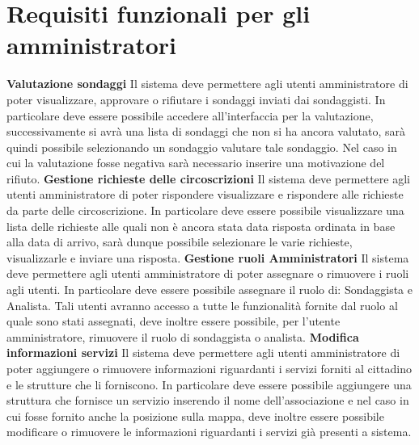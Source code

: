     \section{Requisiti funzionali per gli amministratori}
        \begin{rfList}
            \rfItem \textbf{Valutazione sondaggi} Il sistema deve permettere agli utenti amministratore di poter visualizzare, approvare o rifiutare i sondaggi inviati dai sondaggisti. In particolare deve essere possibile accedere all'interfaccia per la valutazione, successivamente si avrà una lista di sondaggi che non si ha ancora valutato, sarà quindi possibile selezionando un sondaggio valutare tale sondaggio. Nel caso in cui la valutazione fosse negativa sarà necessario inserire una motivazione del rifiuto.
            \rfItem \textbf{Gestione richieste delle circoscrizioni} Il sistema deve permettere agli utenti amministratore di poter rispondere visualizzare e rispondere alle richieste da parte delle circoscrizione. In particolare deve essere possibile visualizzare una lista delle richieste alle quali non è ancora stata data risposta ordinata in base alla data di arrivo, sarà dunque possibile selezionare le varie richieste, visualizzarle e inviare una risposta.
            \rfItem \textbf{Gestione ruoli Amministratori} Il sistema deve permettere agli utenti amministratore di poter assegnare o rimuovere i ruoli agli utenti. In particolare deve essere possibile assegnare il ruolo di: Sondaggista e Analista. Tali utenti avranno accesso a tutte le funzionalità fornite dal ruolo al quale sono stati assegnati, deve inoltre essere possibile, per l'utente amministratore, rimuovere il ruolo di sondaggista o analista.
            \rfItem \textbf{Modifica informazioni servizi} Il sistema deve permettere agli utenti amministratore di poter aggiungere o rimuovere informazioni riguardanti i servizi forniti al cittadino e le strutture che li forniscono. In particolare deve essere possibile aggiungere una struttura che fornisce un servizio inserendo il nome dell'associazione e nel caso in cui fosse fornito anche la posizione sulla mappa, deve inoltre essere possibile modificare o rimuovere le informazioni riguardanti i servizi già presenti a sistema.
        \end{rfList}
